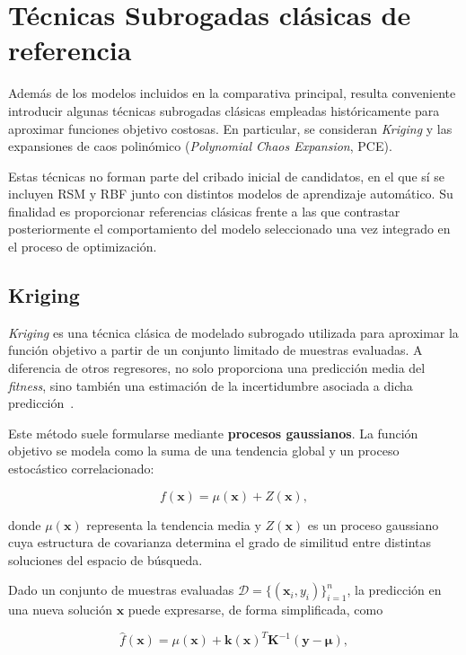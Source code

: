 \section{Técnicas Subrogadas clásicas de referencia}
\label{sec:tecnicas_subrogadas_clasicas}

Además de los modelos incluidos en la comparativa principal, resulta conveniente introducir algunas técnicas subrogadas clásicas empleadas históricamente para aproximar funciones objetivo costosas. En particular, se consideran \textit{Kriging} y las expansiones de caos polinómico (\textit{Polynomial Chaos Expansion}, PCE).

Estas técnicas no forman parte del cribado inicial de candidatos, en el que sí se incluyen RSM y RBF junto con distintos modelos de aprendizaje automático. Su finalidad es proporcionar referencias clásicas frente a las que contrastar posteriormente el comportamiento del modelo seleccionado una vez integrado en el proceso de optimización.

\subsection{Kriging}

\textit{Kriging} es una técnica clásica de modelado subrogado utilizada para aproximar la función objetivo a partir de un conjunto limitado de muestras evaluadas. A diferencia de otros regresores, no solo proporciona una predicción
media del \textit{fitness}, sino también una estimación de la incertidumbre
asociada a dicha predicción~\cite{jones1998}.

Este método suele formularse mediante \textbf{procesos gaussianos}. La función objetivo se modela como la suma de una tendencia global y un proceso estocástico correlacionado:

\begin{equation}
    f(\mathbf{x}) = \mu(\mathbf{x}) + Z(\mathbf{x}),
\end{equation}

donde \(\mu(\mathbf{x})\) representa la tendencia media y \(Z(\mathbf{x})\) es un proceso gaussiano cuya estructura de covarianza determina el grado de similitud entre distintas soluciones del espacio de búsqueda.

Dado un conjunto de muestras evaluadas
\(\mathcal{D} = \{(\mathbf{x}_i, y_i)\}_{i=1}^{n}\),
la predicción en una nueva solución \(\mathbf{x}\) puede expresarse, de forma simplificada, como

\begin{equation}
    \hat{f}(\mathbf{x})
    =
    \mu(\mathbf{x})
    +
    \mathbf{k}(\mathbf{x})^{T}
    \mathbf{K}^{-1}
    \left(
    \mathbf{y} - \boldsymbol{\mu}
    \right),
\end{equation}

